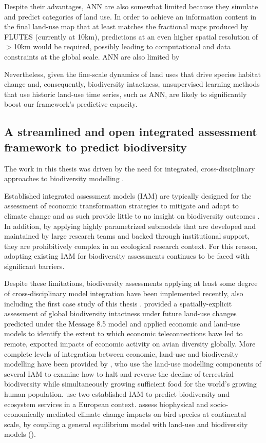 Despite their advantages, ANN are also somewhat limited because they simulate and predict categories of land use. In order to achieve an information content in the final land-use map that at least matches the fractional maps produced by FLUTES (currently at 10km), predictions at an even higher spatial resolution of \(>\)10km would be required, possibly leading to computational and data constraints at the global scale. ANN are also limited by 


Nevertheless, given the fine-scale dynamics of land uses that drive species habitat change and, consequently, biodiversity intactness, unsupervised learning methods that use historic land-use time series, such as ANN, are likely to significantly boost our framework's predictive capacity.

\subsection{A streamlined and open integrated assessment framework to predict biodiversity}

The work in this thesis was driven by the need for integrated, cross-disciplinary approaches to biodiversity modelling \citep{ipbes_summary_2016, ipbes_summary_2019}. 

Established integrated assessment models (IAM) are typically designed for the assessment of economic transformation strategies to mitigate and adapt to climate change and as such provide little to no insight on biodiversity outcomes \citep{harfoot_integrated_2014}. In addition, by applying highly parametrized submodels that are developed and maintained by large research teams and backed through institutional support, they are prohibitively complex in an ecological research context. For this reason, adopting existing IAM for biodiversity assessments continues to be faced with significant barriers. 

Despite these limitations, biodiversity assessments applying at least some degree of cross-disciplinary model integration have been implemented recently, also including the first case study of this thesis \citep[,][]{kapitza_assessing_2021}. \citet{newbold_global_2015} provided a spatially-explicit assessment of global biodiversity intactness under future land-use changes predicted under the Message 8.5 model \citep{riahi_rcp_2011} and \citet{marques_increasing_2019} applied economic and land-use models to identify the extent to which economic teleconnections have led to remote, exported impacts of economic activity on avian diversity globally. More complete levels of integration between economic, land-use and biodiversity modelling have been provided by \citet{leclere_bending_2020}, who use the land-use modelling components of several IAM to examine how to halt and reverse the decline of terrestrial biodiversity while simultaneously growing sufficient food for the world's growing human population. \citet{veerkamp_future_2020} use two established IAM to predict biodiversity and ecosystem services in a European context. \citet{kapitza_assessing_2021} assess biophysical and socio-economically mediated climate change impacts on bird species at continental scale, by coupling a general equilibrium model with land-use and biodiversity models (). 

